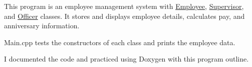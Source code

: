 This program is an employee management system with \mbox{\hyperlink{classEmployee}{Employee}}, \mbox{\hyperlink{classSupervisor}{Supervisor}}, and \mbox{\hyperlink{classOfficer}{Officer}} classes. It stores and displays employee details, calculates pay, and anniversary information.

Main.\+cpp tests the constructors of each class and prints the employee data.

I documented the code and practiced using Doxygen with this program outline. 